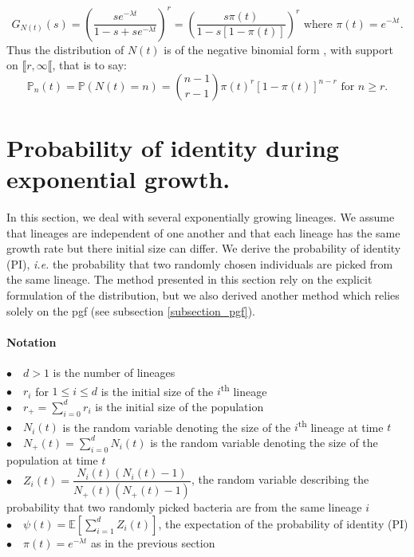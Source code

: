 \documentclass{article}
\newcommand{\pr}{{\mathbb{P}}}
\begin{document}
\begin{equation}
G_{N(t)}(s)=\left( \dfrac{s e^{-\lambda t}}{1-s+s e^{-\lambda t}} \right)^r=\left( \dfrac{s\pi(t)}{1-s[1-\pi(t)]} \right)^r \text{ where }\pi(t)=e^{-\lambda t}.
\end{equation}
Thus the distribution of $N(t)$ is of the negative binomial form \cite[p. 158]{cox1977theory}, with support on $\llbracket r ,\infty \llbracket$, that is to say: 
\begin{equation}
\pr_n(t)=\pr(N(t)=n)=\binom{n-1}{r-1} \pi(t)^r [1-\pi(t)]^{n-r} \text{ for } n \geq r.
\end{equation}

\section{Probability of identity during exponential growth.}
\label{section_PI}
 In this section, we deal with several exponentially growing lineages. We assume that lineages are independent of one another and that each lineage has the same growth rate but there initial size can differ. We derive the probability of identity (PI), \textit{i.e.} the probability that two randomly chosen individuals are picked from the same lineage. The method presented in this section rely on the explicit formulation of the distribution, but we also derived another method which relies solely on the pgf (see subsection \ref{subsection_pgf}).
 \\
  \paragraph{Notation} $ $\\
 $\bullet \quad d>1$ is the number of lineages\\
 $\bullet \quad r_i $ for $1 \leq i \leq d$ is the initial size of the $i$\textsuperscript{th} lineage\\
 $\displaystyle \bullet \quad r_+=\sum_{i=0}^d r_i$ is the initial size of the population \\
 $\bullet \quad N_i(t) $ is the random variable denoting the size of the $i$\textsuperscript{th} lineage at time $t$ \\
 $\displaystyle \bullet \quad N_+(t)=\sum_{i=0}^d N_i(t)$ is the random variable denoting the size of the population at time $t$ \\
 $\bullet \quad Z_i(t)=\dfrac{N_i(t)(N_i(t)-1)}{N_+(t)( N_+(t)-1 ) }$, the random variable describing the probability that two randomly picked bacteria are from the same lineage $i$\\
 $\bullet \quad \psi(t)=\mathbb{E}[\sum_{i=1}^d Z_i(t)]$, the expectation of the probability of identity (PI)\\
 $\bullet \quad \pi(t)=e^{-\lambda t} $ as in the previous section\\
 
\end{document}
